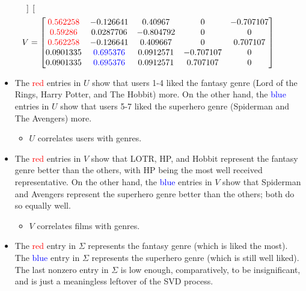 \documentclass{article}
\begin{document}
\begin{itemize}
\begin{align*}
\begin{bmatrix}
        \end{bmatrix}\\
        V &=
        \begin{bmatrix}
            \color{red} 0.562258 & -0.126641 & 0.40967 & 0 & -0.707107\\
            \color{red} 0.59286 & 0.0287706 & -0.804792 & 0 & 0\\
            \color{red} 0.562258 & -0.126641 & 0.409667 & 0 & 0.707107\\
            0.0901335 & \color{blue} 0.695376 & 0.0912571 & -0.707107 & 0\\
            0.0901335 & \color{blue} 0.695376 & 0.0912571 & 0.707107 & 0\\
        \end{bmatrix}
    \end{align*}
    \begin{itemize}
        \item The \textcolor{red}{red} entries in $U$ show that users 1-4 liked the fantasy genre (Lord of the Rings, Harry Potter, and The Hobbit) more. On the other hand, the \textcolor{blue}{blue} entries in $U$ show that users 5-7 liked the superhero genre (Spiderman and The Avengers) more.
        \begin{itemize}
            \item $U$ correlates users with genres.
        \end{itemize}
        \item The \textcolor{red}{red} entries in $V$ show that LOTR, HP, and Hobbit represent the fantasy genre better than the others, with HP being the most well received representative. On the other hand, the \textcolor{blue}{blue} entries in $V$ show that Spiderman and Avengers represent the superhero genre better than the others; both do so equally well.
        \begin{itemize}
            \item $V$ correlates films with genres.
        \end{itemize}
        \item The \textcolor{red}{red} entry in $\Sigma$ represents the fantasy genre (which is liked the most). The \textcolor{blue}{blue} entry in $\Sigma$ represents the superhero genre (which is still well liked). The last nonzero entry in $\Sigma$ is low enough, comparatively, to be insignificant, and is just a meaningless leftover of the SVD process.
    \end{itemize}
\end{itemize}
\end{document}
